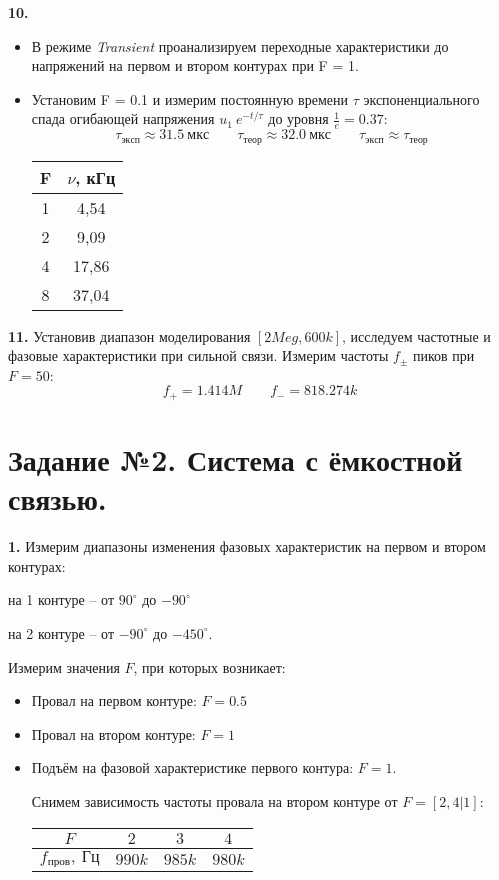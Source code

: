 \textbf{10.}  
\begin{itemize}
	\item В режиме \textit{Transient} проанализируем переходные характеристики до напряжений на первом и втором контурах при F = 1.
	\item Установим F = 0.1 и измерим постоянную времени $ \tau $ экспоненциального спада огибающей напряжения $ u_1 ~ e^{-t/\tau} $ до уровня $ \frac{1}{e} = 0.37 $:
	\[
		\tau_{эксп} \approx 31.5 \ мкс \quad \quad \tau_{теор} \approx 32.0 \ мкс \quad \quad \tau_{эксп} \approx \tau_{теор}
	\]
	
	\begin{table}[!h]
		\centering
		\begin{tabular}{|c|c|}
			\hline
			F & $ \nu $, кГц \\ \hline
			1 & 4,54   \\ \hline
			2 & 9,09   \\ \hline
			4 & 17,86  \\ \hline
			8 & 37,04  \\ \hline
		\end{tabular}
	\end{table}

\end{itemize}
\textbf{11.} Установив диапазон моделирования $[2Meg, 600k]$, исследуем частотные и фазовые характеристики при сильной связи. Измерим частоты $f_{\pm}$ пиков при $F = 50$: 
$$
f_{+} = 1.414M \quad \quad  f_{-} = 818.274k
$$

\newpage

\section*{Задание №2. Система с ёмкостной связью.}
\textbf{1.} Измерим диапазоны изменения фазовых характеристик на первом и втором контурах:

на 1 контуре -- от $90^{\circ}$ до $-90^{\circ}$

на 2 контуре -- от $-90^{\circ}$ до $-450^{\circ}$.

Измерим значения $F$, при которых возникает: 
\begin{itemize}
	\item Провал на первом контуре: $F = 0.5$
	\item Провал на втором контуре: $F = 1$ 
	\item Подъём на фазовой характеристике первого контура: $F = 1$.

Снимем зависимость частоты провала на втором контуре от $F = [2, 4|1]$:

\begin{table}[H]
	\centering
	\begin{tabular}{|c|c|c|c|} \hline
		$F$               & $2$    & $3$    & $4$    \\ \hline
		$f_{\text{пров}},~\text{Гц}$ & $990k$ & $985k$ & $980k$ \\ \hline
	\end{tabular}
\end{table}

\end{itemize}

